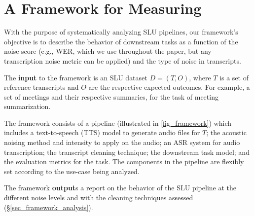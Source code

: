 %

\section{A Framework for Measuring \ENDow{}}
\label{sec_framework}

With the purpose of systematically analyzing SLU pipelines,
our framework's objective is to describe the behavior of downstream tasks as a function of the noise score (e.g., WER, which we use throughout the paper, but any transcription noise metric can be applied) and the type of noise in transcripts. 

The \textbf{input} to the framework is an SLU dataset $D = (T, O)$, where $T$ is a set of reference transcripts and $O$ are the respective expected outcomes. For example, a set of meetings and their respective summaries, for the task of meeting summarization.

The framework consists of a pipeline (illustrated in \autoref{fig_framework}) which includes a text-to-speech (TTS) model to generate audio files for $T$; the acoustic noising method and intensity to apply on the audio; an ASR system for audio transcription; the transcript cleaning technique; the downstream task model; and the evaluation metrics for the task. The components in the pipeline are flexibly set according to the use-case being analyzed.

The framework \textbf{output}s a report on the behavior of the SLU pipeline at the different noise levels and with the cleaning techniques assessed (\S{\ref{sec_framework_analysis}}).



